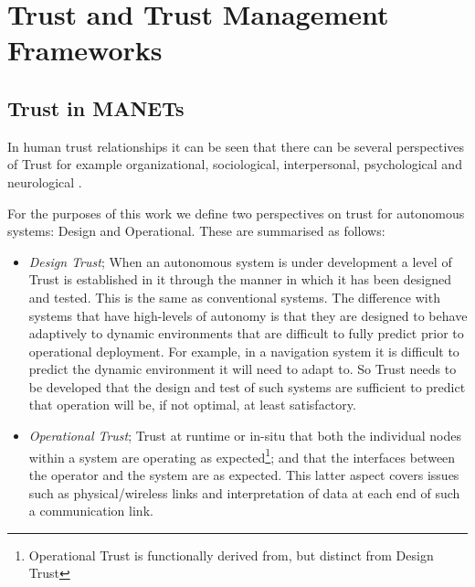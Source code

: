 \documentclass[runningheads,a4paper]{llncs}
\begin{document}
\section{Trust and Trust Management Frameworks}\label{sec:trustandtmfs}

\subsection{Trust in MANETs}\label{sec:trustinmanets}

In human trust relationships it can be seen that there can be several perspectives of Trust for example organizational, sociological, interpersonal, psychological and neurological \cite{Lee2004}. 

For the purposes of this work we define two perspectives on trust for autonomous systems: Design and Operational. These are summarised as follows:

\begin{itemize}
  \item \emph{Design Trust}; When an autonomous system is under development a level of Trust is established in it through the manner in which it has been designed and tested. This is the same as conventional systems. The difference with systems that have high-levels of autonomy is that they are designed to behave adaptively to dynamic environments that are difficult to fully predict prior to operational deployment. For example, in a navigation system it is difficult to predict the dynamic environment it will need to adapt to. So Trust needs to be developed that the design and test of such systems are sufficient to predict that operation will be, if not optimal, at least satisfactory.

  \item \emph{Operational Trust}; Trust at runtime or in-situ that both the individual nodes within a system are operating as expected\footnote{Operational Trust is functionally derived from, but distinct from Design Trust}; and that the interfaces between the operator and the system are as expected. This latter aspect covers issues such as physical/wireless links and interpretation of data at each end of such a communication link.
\end{itemize}
\end{document}
